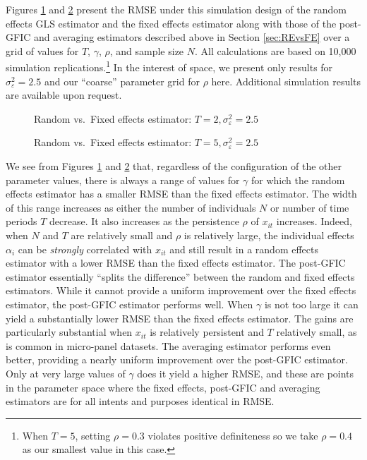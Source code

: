 Figures \ref{fig:REvsFE_T2} and \ref{fig:REvsFE_T5} present the RMSE under this simulation design of the random effects GLS estimator and the fixed effects estimator along with those of the post-GFIC and averaging estimators described above in Section \ref{sec:REvsFE} over a grid of values for $T$, $\gamma$, $\rho$, and sample size $N$.
All calculations are based on 10,000 simulation replications.\footnote{When $T=5$, setting $\rho = 0.3$ violates positive definiteness so we take $\rho=0.4$ as our smallest value in this case.} In the interest of space, we present only results for $\sigma_{\varepsilon}^2 = 2.5$ and our ``coarse'' parameter grid for $\rho$ here. 
Additional simulation results are available upon request.
 

\begin{figure}[h]
  \centering
  
  \caption{Random vs.\ Fixed effects estimator: $T=2, \sigma_{\varepsilon}^2 = 2.5$}
  \label{fig:REvsFE_T2}
\end{figure}

\begin{figure}[h]
  \centering
  
  \caption{Random vs.\ Fixed effects estimator: $T=5, \sigma_{\varepsilon}^2 = 2.5$}
  \label{fig:REvsFE_T5}
\end{figure}

We see from Figures \ref{fig:REvsFE_T2} and \ref{fig:REvsFE_T5} that, regardless of the configuration of the other parameter values, there is always a range of values for $\gamma$ for which the random effects estimator has a smaller RMSE than the fixed effects estimator.
The width of this range increases as either the number of individuals $N$ or number of time periods $T$ decrease.
It also increases as the persistence $\rho$ of $x_{it}$ increases.
Indeed, when $N$ and $T$ are relatively small and $\rho$ is relatively large, the individual effects $\alpha_{i}$ can be \emph{strongly} correlated with $x_{it}$ and still result in a random effects estimator with a lower RMSE than the fixed effects estimator. 
The post-GFIC estimator essentially ``splits the difference'' between the random and fixed effects estimators.
While it cannot provide a uniform improvement over the fixed effects estimator, the post-GFIC estimator performs well.
When $\gamma$ is not too large it can yield a substantially lower RMSE than the fixed effects estimator.
The gains are particularly substantial when $x_{it}$ is relatively persistent and $T$ relatively small, as is common in micro-panel datasets.
The averaging estimator performs even better, providing a nearly uniform improvement over the post-GFIC estimator.
Only at very large values of $\gamma$ does it yield a higher RMSE, and these are points in the parameter space where the fixed effects, post-GFIC and averaging estimators are for all intents and purposes identical in RMSE.

